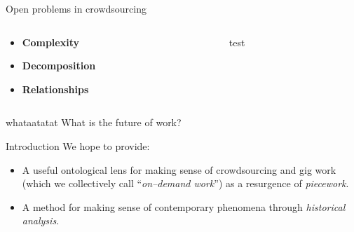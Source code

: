 \documentclass{beamer}
\begin{document}
\begin{frame}[t]{Open problems in crowdsourcing}
\begin{columns}
\begin{column}{0.6\textwidth}
  \begin{itemize}%
    \item<1,4> \textbf{Complexity}~\textcite{suzukiAtelier,KimStoria,yuanAlmost,
                           Nebeling:2016:WCW:2858036.2858169,
                           Hahn:2016:KAB:2858036.2858364}
    \item<2> \textbf{Decomposition}~\textcite{sensitiveTasks,LykourentzouPersonalityMatters,
                              Law:2016:CKC:2858036.2858144,
                              Chang:2016:ACC:2858036.2858411,
                              Newell:2016:OMA:2858036.2858490}
    \item<3> \textbf{Relationships}~\textcite{turkopticon,storiesIraniSilberman,crowdcollab,
                              takingAHITMcInnis}

  \end{itemize}

\end{column}
\begin{column}{0.4\textwidth}
test
\end{column}
\end{columns}
  

\end{frame}

\begin{frame}[standout]{whataatatat}
    What is the future of work?


\end{frame}


\begin{frame}{Introduction}
  We hope to provide:
      \begin{itemize}
        \item A useful ontological lens for making sense of crowdsourcing and gig work (which we collectively call ``\textit{on--demand work}'') as a resurgence of \textit{piecework}.
        \item A method for making sense of contemporary phenomena through \textit{historical analysis}.
      \end{itemize}
\end{frame}
\end{document}
